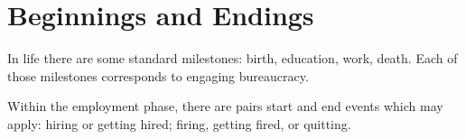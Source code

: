 \section{Beginnings and Endings}
In life there are some standard milestones: birth, education, work, death. Each of those milestones corresponds to engaging bureaucracy. 

Within the employment phase, there are pairs start and end events which may apply: hiring or getting hired; firing, getting fired, or quitting. 

